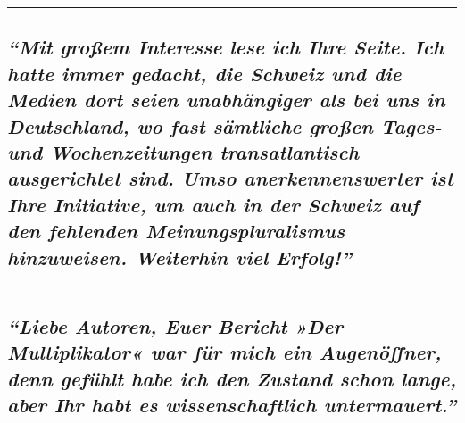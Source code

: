 \begin{center}\rule{0.5\linewidth}{\linethickness}\end{center}

\hypertarget{mit-grouxdfem-interesse-lese-ich-ihre-seite-ich-hatte-immer-gedacht-die-schweiz-und-die-medien-dort-seien-unabhuxe4ngiger-als-bei-uns-in-deutschland-wo-fast-suxe4mtliche-grouxdfen-tages--und-wochenzeitungen-transatlantisch-ausgerichtet-sind-umso-anerkennenswerter-ist-ihre-initiative-um-auch-in-der-schweiz-auf-den-fehlenden-meinungspluralismus-hinzuweisen-weiterhin-viel-erfolg}{%
\subsection{\texorpdfstring{\emph{``Mit großem Interesse lese ich Ihre
Seite. Ich hatte immer gedacht, die Schweiz und die Medien dort seien
unabhängiger als bei uns in Deutschland, wo fast sämtliche großen Tages-
und Wochen­zei­tungen trans­atlantisch ausgerichtet sind. Umso
anerkennens­werter ist Ihre Initiative, um auch in der Schweiz auf den
fehlenden Meinungs­pluralismus hinzuweisen. Weiterhin viel
Erfolg!''}}{``Mit großem Interesse lese ich Ihre Seite. Ich hatte immer gedacht, die Schweiz und die Medien dort seien unabhängiger als bei uns in Deutschland, wo fast sämtliche großen Tages- und Wochen­zei­tungen trans­atlantisch ausgerichtet sind. Umso anerkennens­werter ist Ihre Initiative, um auch in der Schweiz auf den fehlenden Meinungs­pluralismus hinzuweisen. Weiterhin viel Erfolg!''}}\label{mit-grouxdfem-interesse-lese-ich-ihre-seite-ich-hatte-immer-gedacht-die-schweiz-und-die-medien-dort-seien-unabhuxe4ngiger-als-bei-uns-in-deutschland-wo-fast-suxe4mtliche-grouxdfen-tages--und-wochenzeitungen-transatlantisch-ausgerichtet-sind-umso-anerkennenswerter-ist-ihre-initiative-um-auch-in-der-schweiz-auf-den-fehlenden-meinungspluralismus-hinzuweisen-weiterhin-viel-erfolg}}

\begin{center}\rule{0.5\linewidth}{\linethickness}\end{center}

\hypertarget{liebe-autoren-euer-bericht-der-multiplikator-war-fuxfcr-mich-ein-augenuxf6ffner-denn-gefuxfchlt-habe-ich-den-zustand-schon-lange-aber-ihr-habt-es-wissenschaftlich-untermauert-}{%
\subsection{\texorpdfstring{\emph{``Liebe Autoren, Euer Bericht »Der
Multiplikator« war für mich ein Augenöffner, denn gefühlt habe ich den
Zustand schon lange, aber Ihr habt es wissenschaftlich untermauert.''}
}{``Liebe Autoren, Euer Bericht »Der Multiplikator« war für mich ein Augenöffner, denn gefühlt habe ich den Zustand schon lange, aber Ihr habt es wissenschaftlich untermauert.'' }}\label{liebe-autoren-euer-bericht-der-multiplikator-war-fuxfcr-mich-ein-augenuxf6ffner-denn-gefuxfchlt-habe-ich-den-zustand-schon-lange-aber-ihr-habt-es-wissenschaftlich-untermauert-}}

